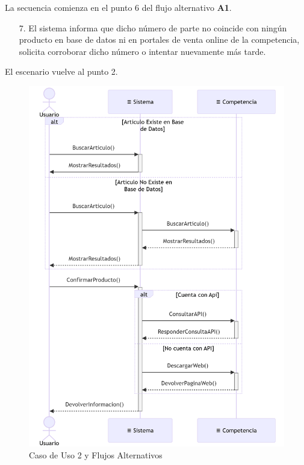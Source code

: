 La secuencia comienza en el punto 6 del flujo alternativo \textbf{A1}.

\begin{enumerate}
	\item [7.] El sistema informa que dicho número de parte no coincide con ningún producto en base de datos ni en portales de venta online de la competencia, 
	solicita corroborar dicho número o intentar nuevamente más tarde.
\end{enumerate}

El escenario vuelve al punto 2.

\begin{figure}[H]
	\centering
	\vspace{15pt}
	\caption{Caso de Uso 2 y Flujos Alternativos}
	\vspace{15pt}
	\includegraphics[width=.9\textwidth]{img/04-diagrama-caso-2.png}
	\vspace{15pt}
\end{figure}

\pagebreak

